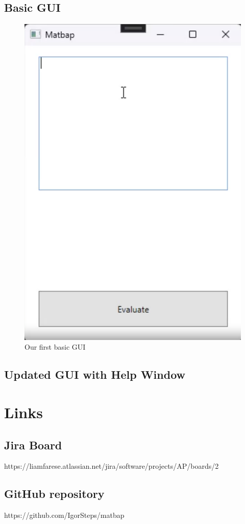 \documentclass[a4paper, oneside, 11pt]{report}
\begin{document}
\section{Basic GUI}
\begin{figure}[H]
\begin{center}
\includegraphics[scale=0.3 ]{Basic GUI.png}
\caption{Our first basic GUI}
\label{basicgui}
\end{center}
\end{figure}

\section{Updated GUI with Help Window}
\label{helpgui}

\chapter{Links}
\label{app:links}
\section{Jira Board}
https://liamfarese.atlassian.net/jira/software/projects/AP/boards/2
\label{ap-jira-link}

\section{GitHub repository}
https://github.com/IgorSteps/matbap
\label{github-repo}
\end{document}
